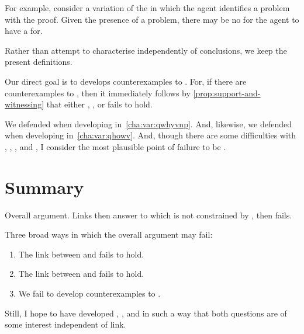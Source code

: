 \begin{note}
{    For example, consider a variation of the \scen{} in which the agent identifies a problem with the proof.
    Given the presence of a problem, there may be no \ros{} for the agent to have a  for.

    Rather than attempt to characterise  independently of conclusions, we keep the present definitions.
  }

  Our direct goal is to develops counterexamples to \issueConstraint{}.
  For, if there are counterexamples to \issueConstraint{}, then it immediately follows by \autoref{prop:support-and-witnessing} that either \linkW{}, \linkH{}, or \issueInclusion{} fails to hold.

  We defended \linkW{} when developing \qWhyV{} in~\autoref{cha:var:qwhyvnp}.
  And, likewise, we defended \linkH{} when developing \qHowV{} in~\autoref{cha:var:qhowv}.
  And, though there are some difficulties with \qWhyV{}, \qHowV{}, \linkW{}, and \linkH{}, I consider the most plausible point of failure to be \issueInclusion{}.
\end{note}

\section*{Summary}

\begin{note}
  Overall argument.
  Links then answer to \qWhyV{} which is not constrained by \qHowV{}, then \issueInclusion{} fails.

  Three broad ways in which the overall argument may fail:
  \begin{enumerate}[label=\arabic*., ref=(\arabic*), noitemsep]
  \item
    The link between \qWhyV{} and \qWhy{} fails to hold.
  \item
    The link between \qHowV{} and \qHow{} fails to hold.
  \item
    We fail to develop counterexamples to \issueConstraint{}.
  \end{enumerate}

  Still, I hope to have developed \qWhyV{}, \qHowV{}, and \issueConstraint{} in such a way that both questions are of some interest independent of link.
\end{note}



